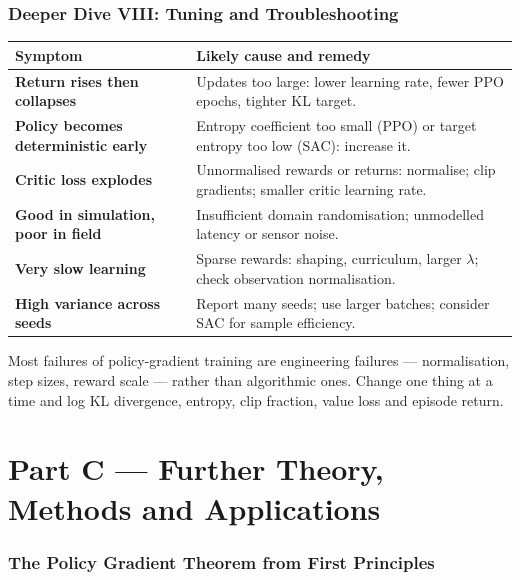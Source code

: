 \documentclass[11pt]{article}
\begin{document}
\section{Deeper Dive VIII: Tuning and Troubleshooting}
\begin{center}\small\renewcommand{\arraystretch}{1.25}
\begin{tabularx}{\textwidth}{>{\bfseries}p{3.6cm}X}\toprule Symptom & Likely cause and remedy\\\midrule
Return rises then collapses & Updates too large: lower learning rate, fewer PPO epochs, tighter KL target.\\
Policy becomes deterministic early & Entropy coefficient too small (PPO) or target entropy too low (SAC): increase it.\\
Critic loss explodes & Unnormalised rewards or returns: normalise; clip gradients; smaller critic learning rate.\\
Good in simulation, poor in field & Insufficient domain randomisation; unmodelled latency or sensor noise.\\
Very slow learning & Sparse rewards: shaping, curriculum, larger $\lambda$; check observation normalisation.\\
High variance across seeds & Report many seeds; use larger batches; consider SAC for sample efficiency.\\\bottomrule
\end{tabularx}\end{center}
\begin{keypoint}Most failures of policy-gradient training are engineering failures --- normalisation, step sizes, reward scale --- rather than algorithmic ones. Change one thing at a time and log KL divergence, entropy, clip fraction, value loss and episode return.\end{keypoint}

\clearpage
\part*{Part C --- Further Theory, Methods and Applications}

\section{The Policy Gradient Theorem from First Principles}
\end{document}
